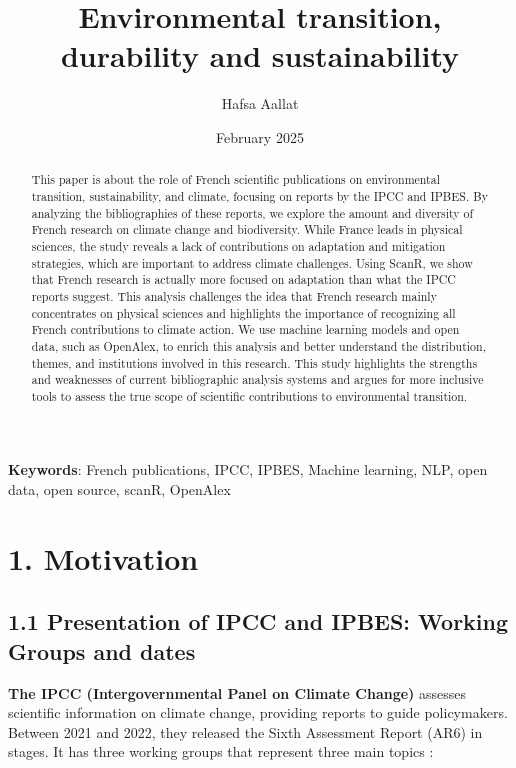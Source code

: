 \documentclass[
]{article}
\title{Environmental transition, durability and sustainability}
\author[%
  1%
  ]{%
  Hafsa Aallat%
}
\affil[1]{French Ministry of Higher Education and Research, Paris,
France}
\date{February 2025}
\begin{document}
\maketitle
\begin{abstract}
This paper is about the role of French scientific publications on
environmental transition, sustainability, and climate, focusing on
reports by the IPCC and IPBES. By analyzing the bibliographies of these
reports, we explore the amount and diversity of French research on
climate change and biodiversity. While France leads in physical
sciences, the study reveals a lack of contributions on adaptation and
mitigation strategies, which are important to address climate
challenges. Using ScanR, we show that French research is actually more
focused on adaptation than what the IPCC reports suggest. This analysis
challenges the idea that French research mainly concentrates on physical
sciences and highlights the importance of recognizing all French
contributions to climate action. We use machine learning models and open
data, such as OpenAlex, to enrich this analysis and better understand
the distribution, themes, and institutions involved in this research.
This study highlights the strengths and weaknesses of current
bibliographic analysis systems and argues for more inclusive tools to
assess the true scope of scientific contributions to environmental
transition.
\end{abstract}

\textbf{Keywords}: French publications, IPCC, IPBES, Machine learning,
NLP, open data, open source, scanR, OpenAlex

\hypertarget{motivation}{%
\section{1. Motivation}\label{motivation}}

\hypertarget{presentation-of-ipcc-and-ipbes-working-groups-and-dates}{%
\subsection{1.1 Presentation of IPCC and IPBES: Working Groups and
dates}\label{presentation-of-ipcc-and-ipbes-working-groups-and-dates}}

\textbf{The IPCC (Intergovernmental Panel on Climate Change)} assesses
scientific information on climate change, providing reports to guide
policymakers. Between 2021 and 2022, they released the Sixth Assessment
Report (AR6) in stages. It has three working groups that represent three
main topics :
\end{document}
